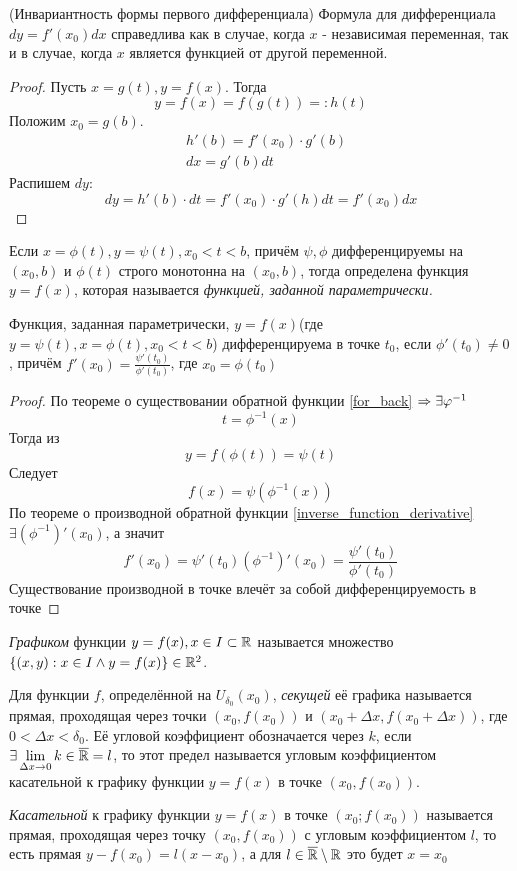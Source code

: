 \begin{corollary} (Инвариантность формы первого дифференциала)
	Формула для дифференциала $dy = f'(x_0)dx$ справедлива как в случае, когда $x$ - независимая переменная, так и в случае, когда $x$ является функцией от другой переменной.
\end{corollary}

\begin{proof}
	Пусть $x = g(t), y = f(x)$. Тогда
	\[
	y = f(x) = f(g(t)) =: h(t)
	\]
	Положим $x_0 = g(b)$.
	\begin{align*}
		&h'(b) = f'(x_0) \cdot g'(b)
		\\
		&dx = g'(b)dt
	\end{align*}
	Распишем $dy$:
	\[
	dy = h'(b) \cdot dt = f'(x_0) \cdot g'(h) dt = f'(x_0) dx
	\]
\end{proof}

\begin{definition}
	Если $x = \phi(t), y = \psi(t), x_0 < t < b$, причём $\psi, \phi$  дифференцируемы на $(x_0, b)$ и $\phi(t)$ строго монотонна на $(x_0, b)$, тогда определена функция $y = f(x)$, которая называется \textit{функцией, заданной параметрически.}
\end{definition}

\begin{theorem}
	Функция, заданная параметрически, $y = f(x)$(где $y = \psi(t), x = \phi(t), x_0 < t < b$) дифференцируема в точке $t_0$, если $\phi'(t_0) \neq 0$, причём $f'(x_0) = \frac{\psi'(t_0)}{\phi'(t_0)}$, где $x_0 = \phi(t_0)$
\end{theorem}

\begin{proof}
	По теореме о существовании обратной функции \ref{for_back} $\Rightarrow \exists \varphi^{-1}$
	\[
		t = \phi^{-1}(x)
	\]
	Тогда из
	\[
		y = f(\phi(t)) = \psi(t)
	\]
	Следует
	\[
		f(x) = \psi(\phi^{-1}(x))
	\]
	По теореме о производной обратной функции \ref{inverse_function_derivative}
	$\exists (\phi^{-1})'(x_0)$, а значит 
	\[
		f'(x_0) = \psi'(t_0)(\phi^{-1})'(x_0) = \frac{\psi'(t_0)}{\phi'(t_0)}
	\]
	Существование производной в точке влечёт за собой дифференцируемость в точке
\end{proof}

\begin{definition}
	\textit{Графиком} функции $y = f(x), x \in I \subset \mathbb{R}$ называется множество $\{(x, y): x \in I \wedge y = f(x)\} \in \mathbb{R}^2$.
	
	Для функции $f$, определённой на $U_{\delta_0}(x_0)$, \textit{секущей} её графика называется прямая, проходящая через точки $(x_0, f(x_0))$ и $(x_0 + \Delta x, f(x_0 + \Delta x))$, где $0 < \Delta x < \delta_0$. Её угловой коэффициент обозначается через $k$, если $\exists \lim\limits_{\Delta x \to 0}k \in \overline{\mathbb{R}} = l$, то этот предел называется угловым коэффициентом касательной к графику функции $y = f(x)$ в точке $(x_0, f(x_0))$.
	
	\textit{Касательной} к графику функции $y = f(x)$ в точке $(x_0; f(x_0))$ называется прямая, проходящая через точку $(x_0, f(x_0))$ с угловым коэффициентом $l$, то есть прямая $y - f(x_0) = l(x - x_0)$, а для $l \in \overline{\mathbb{R}} \setminus \mathbb{R}$ это будет $x = x_0$
\end{definition}

